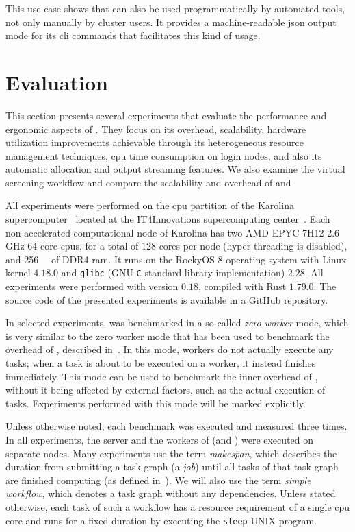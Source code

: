 This use-case shows that \hyperqueue{} can also be used programmatically by automated
tools, not only manually by cluster users. It provides a machine-readable \gls{json}
output mode for its \gls{cli} commands that facilitates this kind of usage.

\section{Evaluation}
\label{hq:evaluation}
This section presents several experiments that evaluate the performance and ergonomic aspects of
\hyperqueue{}. They focus on its overhead, scalability, hardware utilization improvements
achievable through its heterogeneous resource management techniques, \gls{cpu} time consumption on login nodes,
and also its automatic allocation and output streaming features. We also examine the \hyperqueue{}
virtual screening workflow and compare the scalability and overhead of \hyperqueue{} and \dask{}

All experiments were performed on the \gls{cpu} partition of the Karolina
supercomputer~\cite{karolina} located at the IT4Innovations supercomputing
center~\cite{it4i}. Each non-accelerated computational node of Karolina has two AMD
EPYC\texttrademark{} 7H12 2.6 GHz 64 core \glspl{cpu}, for a total of 128 cores
per node (hyper-threading is disabled), and \SI{256}{\gibi\byte} of DDR4
\gls{ram}. It runs on the RockyOS 8 operating system with Linux kernel
$4.18.0$ and \texttt{glibc} (GNU \texttt{C} standard library implementation) $2.28$. All experiments were
performed with \hyperqueue{} version $0.18$, compiled with Rust
$1.79.0$. The source code of the presented experiments is available in
a GitHub repository.

In selected experiments, \hq{} was benchmarked in a so-called
\emph{zero worker} mode, which is very similar to the zero worker mode that has been used to
benchmark the overhead of \rsds{}, described in~. In this
mode, workers do not actually execute any tasks; when a task is about to be executed on a worker,
it instead finishes immediately. This mode can be used to benchmark the inner overhead of
\hyperqueue{}, without it being affected by external factors, such as the actual
execution of tasks. Experiments performed with this mode will be marked explicitly.

Unless otherwise noted, each benchmark was executed and measured three times. In all experiments,
the server and the workers of \hyperqueue{} (and \dask{}) were executed on separate nodes. Many
experiments use the term \emph{makespan}, which describes the duration from submitting a
task graph (a \hyperqueue{} \emph{job}) until all tasks of that task graph
are finished computing (as defined in~). We will also use the term
\emph{simple workflow}, which denotes a task graph without any dependencies. Unless stated
otherwise, each task of such a workflow has a resource requirement of a single
\gls{cpu} core and runs for a fixed duration by executing the \texttt{sleep}
UNIX program.

